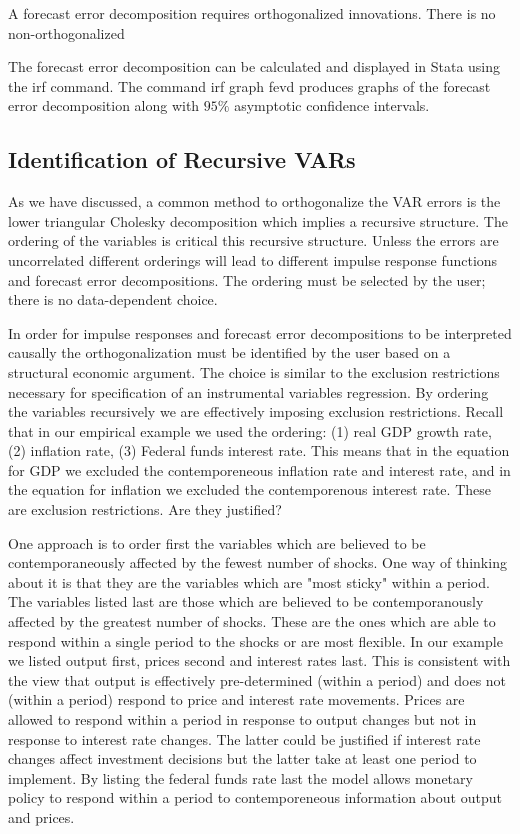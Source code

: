 \documentclass[10pt]{article}
\begin{document}
A forecast error decomposition requires orthogonalized innovations. There is no non-orthogonalized

The forecast error decomposition can be calculated and displayed in Stata using the irf command. The command irf graph fevd produces graphs of the forecast error decomposition along with $95 \%$ asymptotic confidence intervals.

\subsection{Identification of Recursive VARs}
As we have discussed, a common method to orthogonalize the VAR errors is the lower triangular Cholesky decomposition which implies a recursive structure. The ordering of the variables is critical this recursive structure. Unless the errors are uncorrelated different orderings will lead to different impulse response functions and forecast error decompositions. The ordering must be selected by the user; there is no data-dependent choice.

In order for impulse responses and forecast error decompositions to be interpreted causally the orthogonalization must be identified by the user based on a structural economic argument. The choice is similar to the exclusion restrictions necessary for specification of an instrumental variables regression. By ordering the variables recursively we are effectively imposing exclusion restrictions. Recall that in our empirical example we used the ordering: (1) real GDP growth rate, (2) inflation rate, (3) Federal funds interest rate. This means that in the equation for GDP we excluded the contemporeneous inflation rate and interest rate, and in the equation for inflation we excluded the contemporenous interest rate. These are exclusion restrictions. Are they justified?

One approach is to order first the variables which are believed to be contemporaneously affected by the fewest number of shocks. One way of thinking about it is that they are the variables which are "most sticky" within a period. The variables listed last are those which are believed to be contemporanously affected by the greatest number of shocks. These are the ones which are able to respond within a single period to the shocks or are most flexible. In our example we listed output first, prices second and interest rates last. This is consistent with the view that output is effectively pre-determined (within a period) and does not (within a period) respond to price and interest rate movements. Prices are allowed to respond within a period in response to output changes but not in response to interest rate changes. The latter could be justified if interest rate changes affect investment decisions but the latter take at least one period to implement. By listing the federal funds rate last the model allows monetary policy to respond within a period to contemporeneous information about output and prices.
\end{document}

